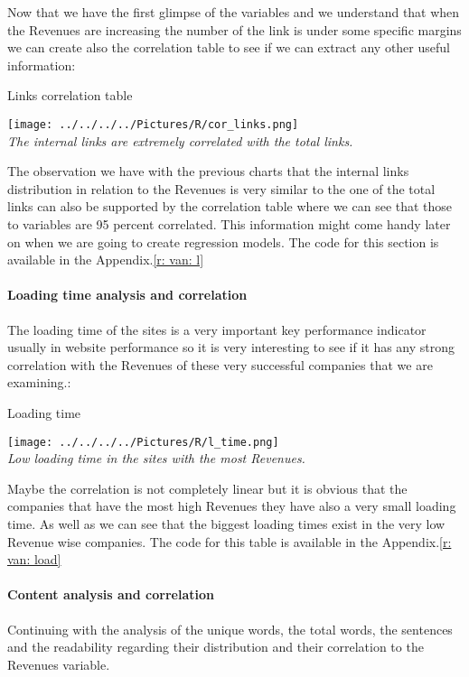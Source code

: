 \documentclass{article}
\begin{document}
Now that we have the first glimpse of the variables and we understand that when the Revenues are increasing the number of the link is under some specific margins we can create also the correlation table to see if we can extract any other useful information:

\begin{table}[H]
\centering
\caption{Links correlation table}
\begin{center}
\texttt{[image: ../../../../Pictures/R/cor\_links.png]}  \\
\textit{The internal links are extremely correlated with the total links.}
\end{center}
\end{table}

The observation we have with the previous charts that the internal links distribution in relation to the Revenues is very similar to the one of the total links can also be supported by the correlation table where we can see that those to variables are 95 percent correlated. This information might come handy later on when we are going to create regression models. The code for this section is available in the Appendix.\ref{r: van: l}
\paragraph{Loading time analysis and correlation}
The loading time of the sites is a very important key performance indicator usually in website performance so it is very interesting to see if it has any strong correlation with the Revenues of these very successful companies that we are examining.:
\begin{table}[H]
\centering
\caption{Loading time}
\begin{center}
\texttt{[image: ../../../../Pictures/R/l\_time.png]}  \\
\textit{Low loading time in the sites with the most Revenues.}
\end{center}
\end{table}

Maybe the correlation is not completely linear but it is obvious that the companies that have the most high Revenues they have also a very small loading time. As well as we can see that the biggest loading times exist in the very low Revenue wise companies. The code for this table is available in the Appendix.\ref{r: van: load}
\paragraph{Content analysis and correlation}
Continuing with the analysis of the unique words, the total words, the sentences and the readability regarding their distribution and their correlation to the Revenues variable.
\end{document}
